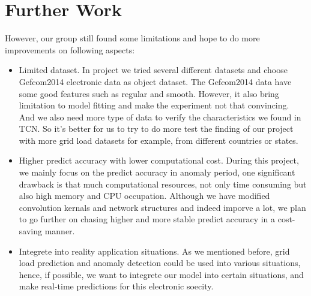 \section{Further Work}
However, our group still found some limitations and hope to do more improvements on following aspects:
\begin{itemize}
    \item Limited dataset. In project we tried several different datasets and choose Gefcom2014 electronic data as object dataset. The Gefcom2014 data have some good features such as regular and smooth. However, it also bring limitation to model fitting and make the experiment not that convincing. And we also need more type of data to verify the characteristics we found in TCN. So it's better for us to try to do more test the finding of our project with more grid load datasets for example, from different countries or states.
    \item Higher predict accuracy with lower computational cost. During this project, we mainly focus on the predict accuracy in anomaly period, one significant drawback is that much computational resources, not only time consuming but also high memory and CPU occupation. Although we have modified convolution kernals and network structures and indeed imporve a lot, we plan to go further on chasing higher and more stable predict accuracy in a cost-saving manner. 
    \item Integrete into reality application situations. As we mentioned before, grid load prediction and anomaly detection could be used into various situations, hence, if possible, we want to integrete our model into certain situations, and make real-time predictions for this electronic soecity.
\end{itemize}